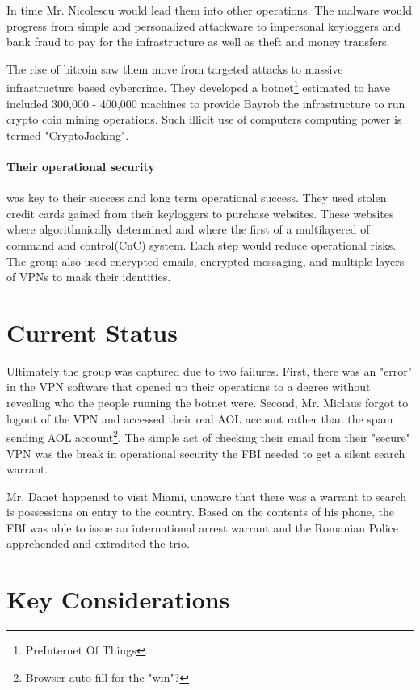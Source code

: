 \documentclass[fleqn,12pt]{SelfArx} %
\begin{document}
In time Mr. Nicolescu would lead them into other operations.  The malware would progress from simple and personalized attackware to impersonal keyloggers and bank fraud to pay for the infrastructure as well as theft and money transfers.  

The rise of bitcoin saw them move from targeted attacks to massive infrastructure based cybercrime. They developed a botnet\footnote{PreInternet Of Things} estimated to have included 300,000 - 400,000 machines to provide Bayrob the infrastructure to run crypto coin mining operations.  Such illicit use of computers computing power is termed "CryptoJacking".
 
\paragraph{Their operational security} was key to their success and long term operational success.  They used stolen credit cards gained from their keyloggers to purchase websites.  These websites where algorithmically determined and where the first of a multilayered of command and control(CnC) system. Each step would reduce operational risks.\cite{Monte:NAaEFrame} The group also used encrypted emails, encrypted messaging, and multiple layers of VPNs to mask their identities.  
    
\section*{Current Status} 
Ultimately the group was captured due to two failures.  First, there was an "error" \cite{Cimpanu:ZD:Bayrob} in the VPN software that opened up their operations to a degree without revealing who the people running the botnet were.  Second, Mr. Miclaus forgot to logout of the VPN and accessed their real AOL account rather than the spam sending AOL account\footnote{Browser auto-fill for the "win"?}.  The simple act of checking their email from their "secure" VPN was the break in operational security the FBI needed to get a silent search warrant.  

Mr. Danet happened to visit Miami, unaware that there was a warrant to search is possessions on entry to the country.  Based on the contents of his phone, the FBI was able to issue an international arrest warrant and the Romanian Police apprehended and extradited the trio. 


\section*{Key Considerations}
\end{document}
